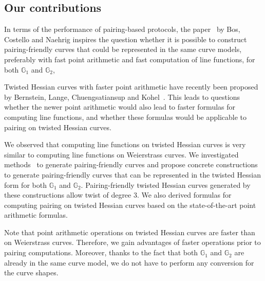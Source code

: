 
\subsection{Our contributions}


In terms of the performance of pairing-based protocols,
the paper~\cite{2013/bos-pairing} by Bos, Costello and Naehrig
inspires the question whether it is possible to
construct pairing-friendly curves that could be represented in the same curve models,
preferably with fast point arithmetic and fast computation of line functions,
for both $\mathbb{G}_1$ and $\mathbb{G}_2$,

Twisted Hessian curves with faster point arithmetic have recently been proposed by
Bernstein, Lange, Chuengsatiansup and Kohel~\cite{2015/hessian}.
This leads to questions whether the newer point arithmetic would also lead to faster formulas for computing line functions,
and whether these formulas would be applicable to pairing on twisted Hessian curves.

We observed that computing line functions on twisted Hessian curves is very similar to computing line functions on Weierstrass curves.
We investigated methods~\cite{2010/freeman} to generate pairing-friendly curves
and propose concrete constructions to generate pairing-friendly curves
that can be represented in the twisted Hessian form for both $\mathbb{G}_1$ and $\mathbb{G}_2$.
Pairing-friendly twisted Hessian curves generated by these constructions allow twist of degree 3.
We also derived formulas for computing pairing on twisted Hessian curves based on the state-of-the-art point arithmetic formulas.

Note that point arithmetic operations on twisted Hessian curves are faster than on Weierstrass curves.
Therefore, we gain advantages of faster operations prior to pairing computations.
Moreover, thanks to the fact that both $\mathbb{G}_1$ and $\mathbb{G}_2$ are already in the same curve model,
we do not have to perform any conversion for the curve shapes.


